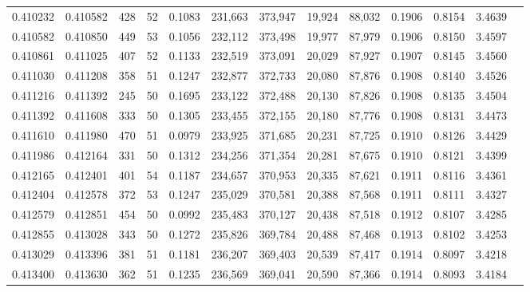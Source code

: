 \begin{tabular}{rrrrrrrrrrrrr}
0.410232 & 0.410582 &   428 &  52 &                                     0.1083 & 231,663 & 373,947 &  19,924 &  88,032 & 0.1906 & 0.8154 & 3.4639 \\
0.410582 & 0.410850 &   449 &  53 &                                     0.1056 & 232,112 & 373,498 &  19,977 &  87,979 & 0.1906 & 0.8150 & 3.4597 \\
0.410861 & 0.411025 &   407 &  52 &                                     0.1133 & 232,519 & 373,091 &  20,029 &  87,927 & 0.1907 & 0.8145 & 3.4560 \\
0.411030 & 0.411208 &   358 &  51 &                                     0.1247 & 232,877 & 372,733 &  20,080 &  87,876 & 0.1908 & 0.8140 & 3.4526 \\
0.411216 & 0.411392 &   245 &  50 &                                     0.1695 & 233,122 & 372,488 &  20,130 &  87,826 & 0.1908 & 0.8135 & 3.4504 \\
0.411392 & 0.411608 &   333 &  50 &                                     0.1305 & 233,455 & 372,155 &  20,180 &  87,776 & 0.1908 & 0.8131 & 3.4473 \\
0.411610 & 0.411980 &   470 &  51 &                                     0.0979 & 233,925 & 371,685 &  20,231 &  87,725 & 0.1910 & 0.8126 & 3.4429 \\
0.411986 & 0.412164 &   331 &  50 &                                     0.1312 & 234,256 & 371,354 &  20,281 &  87,675 & 0.1910 & 0.8121 & 3.4399 \\
0.412165 & 0.412401 &   401 &  54 &                                     0.1187 & 234,657 & 370,953 &  20,335 &  87,621 & 0.1911 & 0.8116 & 3.4361 \\
0.412404 & 0.412578 &   372 &  53 &                                     0.1247 & 235,029 & 370,581 &  20,388 &  87,568 & 0.1911 & 0.8111 & 3.4327 \\
0.412579 & 0.412851 &   454 &  50 &                                     0.0992 & 235,483 & 370,127 &  20,438 &  87,518 & 0.1912 & 0.8107 & 3.4285 \\
0.412855 & 0.413028 &   343 &  50 &                                     0.1272 & 235,826 & 369,784 &  20,488 &  87,468 & 0.1913 & 0.8102 & 3.4253 \\
0.413029 & 0.413396 &   381 &  51 &                                     0.1181 & 236,207 & 369,403 &  20,539 &  87,417 & 0.1914 & 0.8097 & 3.4218 \\
0.413400 & 0.413630 &   362 &  51 &                                     0.1235 & 236,569 & 369,041 &  20,590 &  87,366 & 0.1914 & 0.8093 & 3.4184 \\

\end{tabular}
